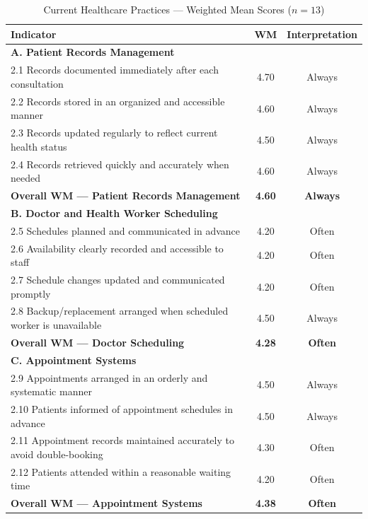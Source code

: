 \documentclass{research}
\begin{document}
\begin{table}[H]
  \centering
  \caption{Current Healthcare Practices --- Weighted Mean Scores ($n = 13$)}
  \label{tab:practices}
  \begin{tabular}{p{9cm}cc}
    \toprule
    \textbf{Indicator} & \textbf{WM} & \textbf{Interpretation} \\
    \midrule
    \multicolumn{3}{l}{\textbf{A. Patient Records Management}} \\
    2.1 Records documented immediately after each consultation & 4.70 & Always \\
    2.2 Records stored in an organized and accessible manner   & 4.60 & Always \\
    2.3 Records updated regularly to reflect current health status & 4.50 & Always \\
    2.4 Records retrieved quickly and accurately when needed   & 4.60 & Always \\
    \textbf{Overall WM --- Patient Records Management}        & \textbf{4.60} & \textbf{Always} \\
    \midrule
    \multicolumn{3}{l}{\textbf{B. Doctor and Health Worker Scheduling}} \\
    2.5 Schedules planned and communicated in advance          & 4.20 & Often \\
    2.6 Availability clearly recorded and accessible to staff  & 4.20 & Often \\
    2.7 Schedule changes updated and communicated promptly     & 4.20 & Often \\
    2.8 Backup/replacement arranged when scheduled worker is unavailable & 4.50 & Always \\
    \textbf{Overall WM --- Doctor Scheduling}                  & \textbf{4.28} & \textbf{Often} \\
    \midrule
    \multicolumn{3}{l}{\textbf{C. Appointment Systems}} \\
    2.9 Appointments arranged in an orderly and systematic manner & 4.50 & Always \\
    2.10 Patients informed of appointment schedules in advance  & 4.50 & Always \\
    2.11 Appointment records maintained accurately to avoid double-booking & 4.30 & Often \\
    2.12 Patients attended within a reasonable waiting time     & 4.20 & Often \\
    \textbf{Overall WM --- Appointment Systems}                & \textbf{4.38} & \textbf{Often} \\
    \bottomrule
  \end{tabular}
\end{table}
\end{document}
